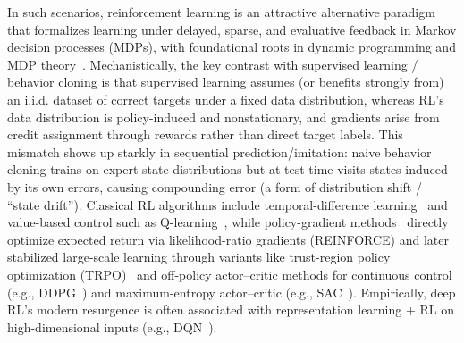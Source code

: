 \documentclass[10pt]{article} %
\begin{document}
In such scenarios, reinforcement learning is an attractive alternative paradigm that formalizes learning under delayed, sparse, and evaluative feedback in Markov decision processes (MDPs), with foundational roots in dynamic programming and MDP theory~\citep{mdp}. Mechanistically, the key contrast with supervised learning / behavior cloning is that supervised learning assumes (or benefits strongly from) an i.i.d. dataset of correct targets under a fixed data distribution, whereas RL’s data distribution is policy-induced and nonstationary, and gradients arise from credit assignment through rewards rather than direct target labels. This mismatch shows up starkly in sequential prediction/imitation: naive behavior cloning trains on expert state distributions but at test time visits states induced by its own errors, causing compounding error (a form of distribution shift / “state drift”). Classical RL algorithms include temporal-difference learning~\citep{sutton1988learning,sutton1998reinforcement} and value-based control such as Q-learning~\citep{watkins1992qlearning}, while policy-gradient methods~\citep{williams1992simple,sutton1999policy} directly optimize expected return via likelihood-ratio gradients (REINFORCE) and later stabilized large-scale learning through variants like trust-region policy optimization (TRPO)~\citep{schulman2017trustregionpolicyoptimization} and off-policy actor–critic methods for continuous control (e.g., DDPG~\citep{lillicrap2019continuouscontroldeepreinforcement}) and maximum-entropy actor–critic (e.g., SAC~\citep{haarnoja2018softactorcriticoffpolicymaximum}). Empirically, deep RL’s modern resurgence is often associated with representation learning + RL on high-dimensional inputs (e.g., DQN~\citep{mnih2013playingatarideepreinforcement}).
\end{document}
